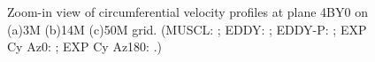 \begin{figure}[t]
     \caption{Zoom-in view of circumferential velocity profiles at plane 4BY0 on (a)3M (b)14M (c)50M grid. (MUSCL: \mline; EDDY: \eline; EDDY-P: \epline; EXP Cy Az0: \bluecrx; EXP Cy Az180: \redcrx.)}
     \label{zv} 
\end{figure}
